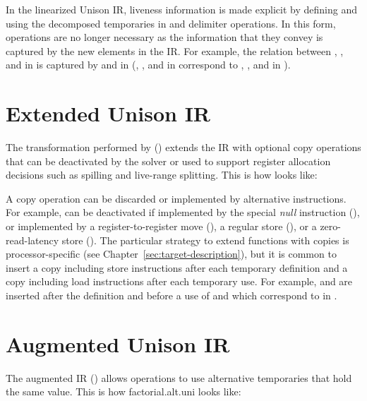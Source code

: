 \documentclass[11pt]{report}
\newenvironment{colorBox}[1]
 {\begin{tcolorbox}[
    breakable,
    colback=#1,
    colframe=white,
    boxrule=0pt
  ]}
 {\end{tcolorbox}}
\newenvironment{codeBox}
 {\begin{colorBox}{bgcolor4!20}}
 {\end{colorBox}}
\begin{document}
In the linearized Unison IR, liveness information is made explicit by defining
and using the decomposed temporaries in  and  delimiter
operations.
%
In this form,  operations are no longer necessary as the information
that they convey is captured by the new elements in the IR.
%
For example, the relation between , , and  in
 is captured by  and  in
 (, , and  in
 correspond to , , and  in
).

\section{Extended Unison IR}

The transformation performed by  () extends the
IR with optional copy operations that can be deactivated by the solver or used
to support register allocation decisions such as spilling and live-range
splitting.
%
This is how  looks like:

\begin{codeBox}
\end{codeBox}

A copy operation can be discarded or implemented by alternative instructions.
%
For example,  can be deactivated if implemented by the special
\emph{null} instruction (\code{-}), or implemented by a register-to-register
move (), a regular store (), or a zero-read-latency store
().
%
The particular strategy to extend functions with copies is processor-specific
(see Chapter~\ref{sec:target-description}), but it is common to insert a copy
including store instructions after each temporary definition and a copy
including load instructions after each temporary use.
%
For example,  and  are inserted after the definition and
before a use of  and  which correspond to  in
.

\section{Augmented Unison IR}

The augmented IR () allows operations to use alternative
temporaries that hold the same value.
%
This is how factorial.alt.uni looks like:
\end{document}
